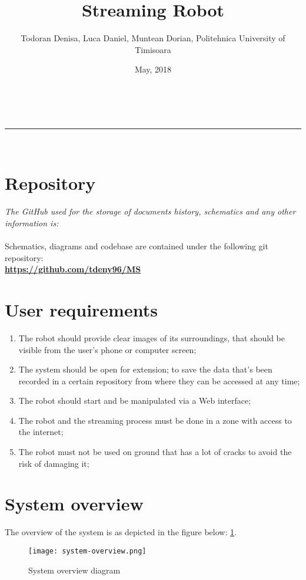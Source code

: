 \documentclass[a4paper,11pt]{article}
\makeatletter
\newcommand{\divider}{\rule{\linewidth}{0.5pt}}
\renewcommand{\maketitle}{
\begin{center}
\vspace{2ex}
{\huge \textsc{\@title}}
\vspace{1ex}
\\
\divider\\
\@author \hfill \@date
\vspace{4ex}
\end{center}
}
\makeatother
\begin{document}
\title{Streaming Robot}

\author{Todoran Denisa, Luca Daniel, Muntean Dorian, Politehnica University of Timisoara} 

\date{May, 2018}

\maketitle


\section{Repository}
\textit{The GitHub used for the storage of documents history, schematics and any other information
is:}\\\\
Schematics, diagrams and codebase are contained under the following git repository:\\
\textbf{\url{https://github.com/tdeny96/MS}}

\section{User requirements}

\begin{enumerate}  
\item The robot should provide clear images of its surroundings, that should be visible from the user’s phone or computer screen;
\item The system should be open for extension; to save the data that’s been recorded in a certain repository from where they can be accessed at any time;
\item The robot should start and be manipulated via a Web interface;
\item The robot and the streaming process must be done in a zone with access to the internet;
\item The robot must not be used on ground that has a lot of cracks to avoid the risk of damaging it;
\end{enumerate}

\section{System overview}

The overview of the system is as depicted in the figure below: \ref{fig:system}.

\begin{figure}[h]
\centering
\texttt{[image: system-overview.png]}
\caption{System overview diagram}
\label{fig:system}
\end{figure}
\end{document}
